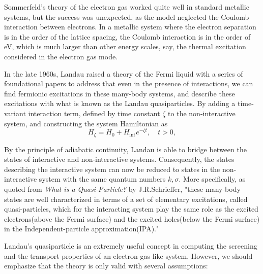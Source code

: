 Sommerfeld's theory of the electron gas worked quite well in standard metallic systems, but the success was unexpected, as the model neglected the Coulomb interaction between electrons. In a metallic system where the electron separation is in the order of the lattice spacing, the Coulomb interaction is in the order of eV, which is much larger than other energy scales, say, the thermal excitation considered in the electron gas mode. 

In the late 1960s, Landau raised a theory of the Fermi liquid with a series of foundational papers\cite{Landau1956}\cite{Landau1957} to address that even in the presence of interactions, we can find fermionic excitations in these many-body systems, and describe these excitations with what is known as the Landau quasiparticles. By adding a time-variant interaction term, defined by time constant $\zeta$ to the non-interactive system, and constructing the system Hamiltonian as
\begin{equation}\label{adiabatic}
	H_{\zeta} = H_0 + H_{\text{int}} e^{-\zeta t}, \quad t > 0,
\end{equation}

By the principle of adiabatic continuity, Landau is able to bridge between the states of interactive and non-interactive systems. Consequently, the states describing the interactive system can now be reduced to states in the non-interactive system with the same quantum numbers $k, \sigma$. More specifically, as quoted from \textit{What is a Quasi-Particle?} by J.R.Schrieffer, "these many-body states are well characterized in terms of a set of elementary excitations, called quasi-particles, which for the interacting system play the same role as the excited electrons(above the Fermi surface) and the excited holes(below the Fermi surface) in the Independent-particle approximation(IPA)." 

Landau's quasiparticle is an extremely useful concept in computing the screening and the transport properties of an electron-gas-like system. However, we should emphasize that the theory is only valid with several assumptions:

